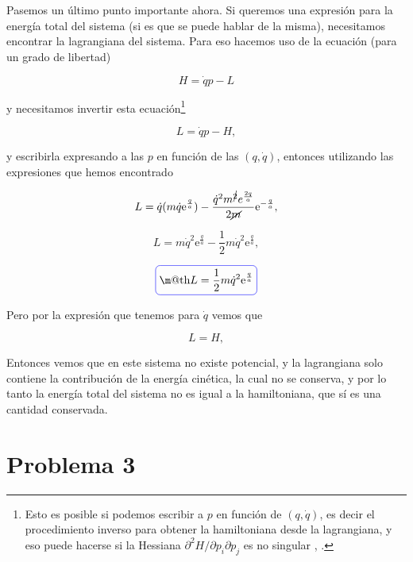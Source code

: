 \documentclass[a4paper,10pt]{article}
\makeatletter
\numberwithin{equation}{section}
\newcommand*{\boxcolor}{blue}
\renewcommand{\boxed}[1]{\textcolor{\boxcolor}{%
\tikz[baseline={([yshift=-1ex]current bounding box.center)}] \node [rectangle, minimum width=1ex,rounded corners,draw] {\normalcolor\m@th$\displaystyle#1$};}}
\newcommand{\euler}{\mathrm{e}}
\makeatother
\begin{document}
Pasemos un último punto importante ahora. Si queremos una expresión para la energía 
total del sistema (si es que se puede hablar de la misma), necesitamos encontrar 
la lagrangiana del sistema. Para eso hacemos uso de la ecuación (para un grado de 
libertad)

\begin{equation}
 H = \dot{q}p - L
\end{equation}

y necesitamos invertir esta ecuación\footnote{\label{pie:1}Esto es posible si podemos escribir 
a $p$ en función de $(q,\dot{q})$, es decir el procedimiento inverso para obtener 
la hamiltoniana desde la lagrangiana, y eso puede hacerse si la Hessiana 
$\partial^2 H/\partial p_i \partial p_j$ es no singular \cite{saletan}, \cite{abraham}.}

\begin{equation}
 L = \dot{q}p - H,
\end{equation}

y escribirla expresando a las $p$ en función de las $(q,\dot{q})$, entonces utilizando 
las expresiones que hemos encontrado

\begin{equation}
 L = \dot{q}(m\dot{q}\euler^{\frac{q}{a}}) - \frac{\dot{q}^2m^{\cancel{2}}e^{\frac{2q}{a}}}{2\cancel{m}}\euler^{-\frac{q}{a}},
\end{equation}

\begin{equation}
 L = m\dot{q}^2\euler^{\frac{q}{a}} - \frac{1}{2}m\dot{q}^2\euler^{\frac{q}{a}},
\end{equation}

\begin{equation}
 \boxed{L = \frac{1}{2}m\dot{q}^2\euler^{\frac{q}{a}}}
\end{equation}

Pero por la expresión que tenemos para $\dot{q}$ vemos que 

\begin{equation}
 L = H,
\end{equation}

Entonces vemos que en este sistema no existe potencial, y la lagrangiana solo 
contiene la contribución de la energía cinética, la cual no se conserva, y por lo 
tanto la energía total del sistema no es igual a la hamiltoniana, que sí es una 
cantidad conservada.

\section{Problema 3}
\end{document}
